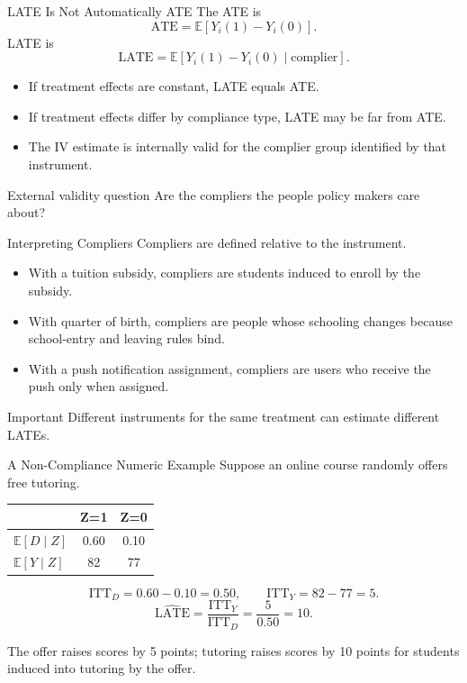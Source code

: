 \documentclass[11pt,aspectratio=169]{beamer}
\newcommand{\E}{\mathbb{E}}
\newcommand{\ATE}{\mathrm{ATE}}
\newcommand{\LATE}{\mathrm{LATE}}
\newcommand{\ITT}{\mathrm{ITT}}
\begin{document}
\begin{frame}{LATE Is Not Automatically ATE}
  The ATE is
  \[
    \ATE=\E[Y_i(1)-Y_i(0)].
  \]
  LATE is
  \[
    \LATE=\E[Y_i(1)-Y_i(0)\mid \text{complier}].
  \]

  \begin{itemize}
    \item If treatment effects are constant, LATE equals ATE.
    \item If treatment effects differ by compliance type, LATE may be far from ATE.
    \item The IV estimate is internally valid for the complier group identified by that instrument.
  \end{itemize}

  \begin{block}{External validity question}
    Are the compliers the people policy makers care about?
  \end{block}
\end{frame}

\begin{frame}{Interpreting Compliers}
  Compliers are defined relative to the instrument.

  \begin{itemize}
    \item With a tuition subsidy, compliers are students induced to enroll by the subsidy.
    \item With quarter of birth, compliers are people whose schooling changes because school-entry and leaving rules bind.
    \item With a push notification assignment, compliers are users who receive the push only when assigned.
  \end{itemize}

  \begin{block}{Important}
    Different instruments for the same treatment can estimate different LATEs.
  \end{block}
\end{frame}

\begin{frame}{A Non-Compliance Numeric Example}
  Suppose an online course randomly offers free tutoring.

  \begin{center}
  \begin{tabular}{lcc}
    \toprule
    & Z=1 & Z=0 \\
    \midrule
    \(\E[D\mid Z]\) & 0.60 & 0.10 \\
    \(\E[Y\mid Z]\) & 82 & 77 \\
    \bottomrule
  \end{tabular}
  \end{center}

  \[
    \ITT_D = 0.60-0.10=0.50,
    \qquad
    \ITT_Y = 82-77=5.
  \]
  \[
    \widehat{\LATE}=\frac{\ITT_Y}{\ITT_D}=\frac{5}{0.50}=10.
  \]

  The offer raises scores by 5 points; tutoring raises scores by 10 points for students induced into tutoring by the offer.
\end{frame}
\end{document}
